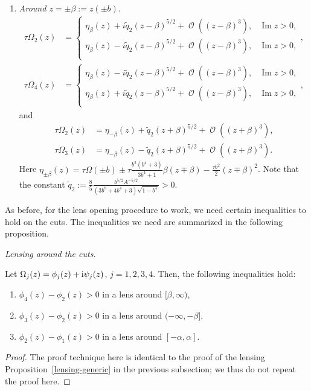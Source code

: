\documentclass[pdftex]{sigma}
\DeclareMathOperator{\OO}{\mathcal{O}}
\numberwithin{equation}{section}
\begin{document}
\begin{prop}
\begin{enumerate}
 \item \textit{Around $z = \pm\beta := z(\pm b).$}
 \begin{align}
 \tau\Omega_2(z) &=
 \begin{cases}
 \eta_{\beta}(z) + i\tilde{q}_2 (z-\beta)^{5/2} + \OO((z-\beta)^3), & \operatorname{Im}z>0,\\
 \eta_{\beta}(z) - i\tilde{q}_2 (z-\beta)^{5/2} + \OO((z-\beta)^3),& \operatorname{Im}z>0,\\
 \end{cases},\\
 \tau\Omega_4(z) &=
 \begin{cases}
 \eta_{\beta}(z) -i\tilde{q}_2 (z-\beta)^{5/2} + \OO((z-\beta)^3), & \operatorname{Im}z>0,\\
 \eta_{\beta}(z) + i\tilde{q}_2 (z-\beta)^{5/2} + \OO((z-\beta)^3),& \operatorname{Im}z>0,\\
 \end{cases},
 \end{align}
 and
 \begin{align}
 \tau\Omega_2(z) &= \eta_{-\beta}(z) + \tilde{q}_2 (z+\beta)^{5/2} + \OO((z+\beta)^3),\\
 \tau\Omega_3(z) &= \eta_{-\beta}(z) - \tilde{q}_2 (z+\beta)^{5/2} + \OO((z+\beta)^3).
 \end{align}
Here $\eta_{\pm \beta}(z) = \tau \Omega(\pm b) \pm \tau \frac{b^2(b^4+3)}{3b^4+1}\beta(z\mp\beta) -\frac{\tau b^2}{2}(z\mp\beta)^2$. Note that the constant $\tilde{q}_2 := \frac{8}{5}\frac{b^{5/2}A^{-5/2}}{(3b^8+4b^4+3)\sqrt{1-b^4}} >0$.
 \end{enumerate}
\end{prop}
As before, for the lens opening procedure to work, we need certain inequalities to hold on the cuts. The inequalities we need are summarized in the following proposition.
 \begin{prop}
 \textit{Lensing around the cuts.}

 Let $\Omega_j(z) = \phi_j(z) + {\rm i}\psi_j(z)$, $j= 1,2,3,4$. Then, the following inequalities hold:
 \begin{enumerate}\itemsep=0pt
 \item $\phi_4(z) - \phi_2(z) > 0$ in a lens around $[\beta,\infty)$,
 \item $\phi_3(z) - \phi_2(z) > 0$ in a lens around $(-\infty,-\beta]$,
 \item $\phi_2(z) - \phi_1(z) > 0$ in a lens around $[-\alpha,\alpha]$.
 \end{enumerate}
 \end{prop}
\begin{proof}
 The proof technique here is identical to the proof of the lensing Proposition~\ref{lensing-generic} in the previous subsection; we thus do not repeat the proof here.
\end{proof}
\end{document}
